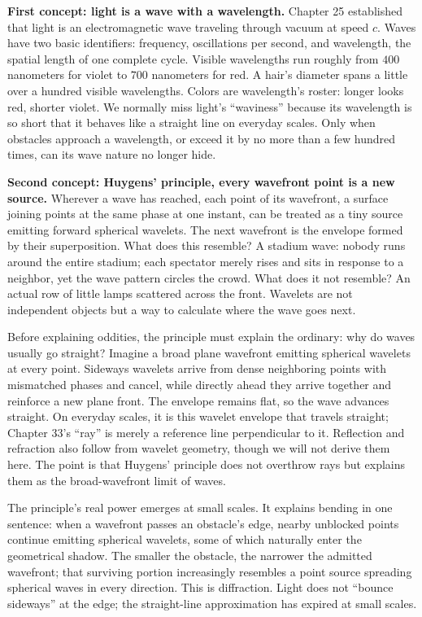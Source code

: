 \begin{mainline}
\textbf{First concept: light is a wave with a wavelength.} Chapter 25 established that light is an electromagnetic wave traveling through vacuum at speed \(c\). Waves have two basic identifiers: frequency, oscillations per second, and wavelength, the spatial length of one complete cycle. Visible wavelengths run roughly from \(400\) nanometers for violet to \(700\) nanometers for red. A hair's diameter spans a little over a hundred visible wavelengths. Colors are wavelength's roster: longer looks red, shorter violet. We normally miss light's ``waviness'' because its wavelength is so short that it behaves like a straight line on everyday scales. Only when obstacles approach a wavelength, or exceed it by no more than a few hundred times, can its wave nature no longer hide.

\textbf{Second concept: Huygens' principle, every wavefront point is a new source.} Wherever a wave has reached, each point of its wavefront, a surface joining points at the same phase at one instant, can be treated as a tiny source emitting forward spherical wavelets. The next wavefront is the envelope formed by their superposition. What does this resemble? A stadium wave: nobody runs around the entire stadium; each spectator merely rises and sits in response to a neighbor, yet the wave pattern circles the crowd. What does it not resemble? An actual row of little lamps scattered across the front. Wavelets are not independent objects but a way to calculate where the wave goes next.

Before explaining oddities, the principle must explain the ordinary: why do waves usually go straight? Imagine a broad plane wavefront emitting spherical wavelets at every point. Sideways wavelets arrive from dense neighboring points with mismatched phases and cancel, while directly ahead they arrive together and reinforce a new plane front. The envelope remains flat, so the wave advances straight. On everyday scales, it is this wavelet envelope that travels straight; Chapter 33's ``ray'' is merely a reference line perpendicular to it. Reflection and refraction also follow from wavelet geometry, though we will not derive them here. The point is that Huygens' principle does not overthrow rays but explains them as the broad-wavefront limit of waves.

The principle's real power emerges at small scales. It explains bending in one sentence: when a wavefront passes an obstacle's edge, nearby unblocked points continue emitting spherical wavelets, some of which naturally enter the geometrical shadow. The smaller the obstacle, the narrower the admitted wavefront; that surviving portion increasingly resembles a point source spreading spherical waves in every direction. This is diffraction. Light does not ``bounce sideways'' at the edge; the straight-line approximation has expired at small scales.


\end{mainline}
